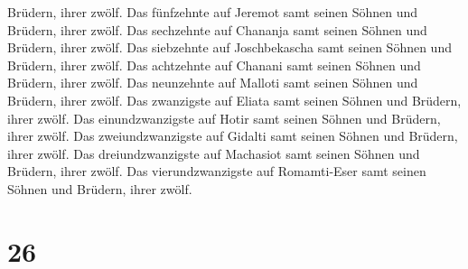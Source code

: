 Brüdern, ihrer zwölf.  Das fünfzehnte auf Jeremot samt
seinen Söhnen und Brüdern, ihrer zwölf.  Das sechzehnte
auf Chananja samt seinen Söhnen und Brüdern, ihrer zwölf.
 Das siebzehnte auf Joschbekascha samt seinen Söhnen und
Brüdern, ihrer zwölf.  Das achtzehnte auf Chanani samt
seinen Söhnen und Brüdern, ihrer zwölf.  Das neunzehnte
auf Malloti samt seinen Söhnen und Brüdern, ihrer zwölf. 
Das zwanzigste auf Eliata samt seinen Söhnen und Brüdern, ihrer zwölf.
 Das einundzwanzigste auf Hotir samt seinen Söhnen und
Brüdern, ihrer zwölf.  Das zweiundzwanzigste auf Gidalti
samt seinen Söhnen und Brüdern, ihrer zwölf.  Das
dreiundzwanzigste auf Machasiot samt seinen Söhnen und Brüdern, ihrer
zwölf.  Das vierundzwanzigste auf Romamti-Eser samt
seinen Söhnen und Brüdern, ihrer zwölf.

\hypertarget{section-25}{%
\section{26}\label{section-25}}

